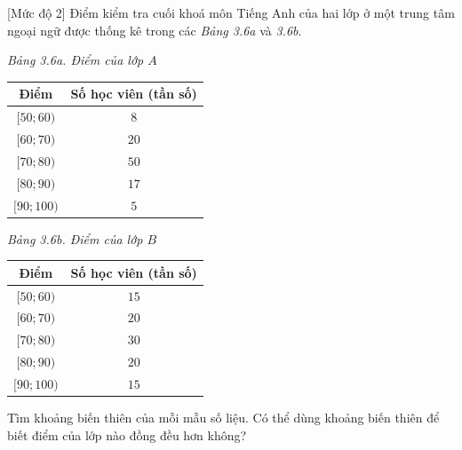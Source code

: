 \begin{bt}%
[Mức độ 2]
Điểm kiểm tra cuối khoá môn Tiếng Anh của hai lớp ở một trung tâm ngoại ngữ được thống kê trong các {\it Bảng 3.6a} và {\it 3.6b}.

\begin{minipage}{.5\textwidth}
	\begin{center}
		{\it Bảng 3.6a. Điểm của lớp $A$}\\
		\begin{tabular}{|c|c|}
			\hline Điểm & Số học viên (tần số) \\
			\hline $[50; 60)$ & $8$ \\
			\hline $[60; 70)$ & $20$\\
			\hline $[70; 80)$ & $50$\\
			\hline $[80; 90)$ & $17$\\
			\hline $[90; 100)$ & $5$ \\
			\hline
		\end{tabular}
	\end{center}
\end{minipage}
\begin{minipage}{.5\textwidth}
	\begin{center}
		{\it Bảng 3.6b. Điểm của lớp $B$}\\
		\begin{tabular}{|c|c|}
			\hline Điểm & Số học viên (tần số) \\
			\hline $[50; 60)$ & $15$\\
			\hline $[60; 70)$ & $20$\\
			\hline $[70; 80)$ & $30$\\
			\hline $[80; 90)$ & $20$\\
			\hline $[90; 100)$ & $15$\\
			\hline
		\end{tabular}
	\end{center}
\end{minipage}
Tìm khoảng biến thiên của mỗi mẫu số liệu. Có thể dùng khoảng biến thiên để biết điểm của lớp nào đồng đều hơn không?
\end{bt}

